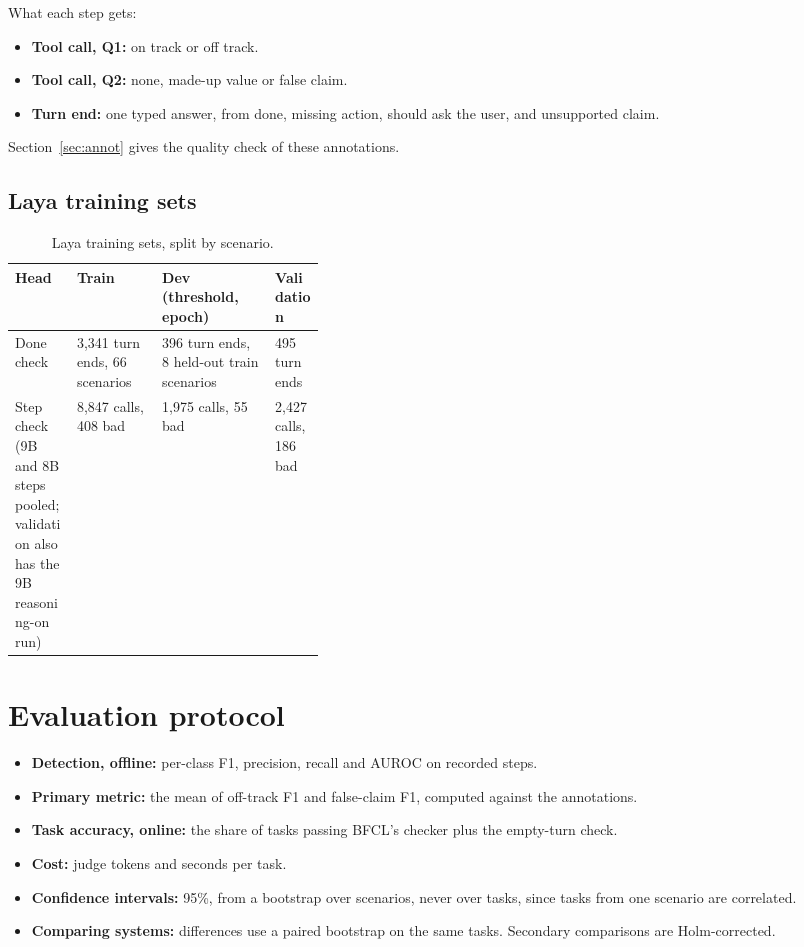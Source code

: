 \documentclass[10.5pt,a4paper]{article}
\newcommand{\tablestyle}{\small\rowcolors{2}{rowshade}{white}}
\begin{document}
What each step gets:
\begin{itemize}
  \item \textbf{Tool call, Q1:} on track or off track.
  \item \textbf{Tool call, Q2:} none, made-up value or false claim.
  \item \textbf{Turn end:} one typed answer, from done, missing action, should ask the user, and unsupported claim.
\end{itemize}

Section~\ref{sec:annot} gives the quality check of these annotations.

\subsection{Laya training sets}
\begin{table}[H]
\centering\tablestyle
\caption{Laya training sets, split by scenario.}\label{tab:layadata}
\begin{tabularx}{\linewidth}{P{0.2\linewidth}YYP{0.16\linewidth}}
\toprule
{}\textbf{Head} & \textbf{Train} & \textbf{Dev (threshold, epoch)} & \textbf{Validation} \\
\midrule
Done check & 3,341 turn ends, 66 scenarios & 396 turn ends, 8 held-out train scenarios & 495 turn ends \\
Step check (9B and 8B steps pooled; validation also has the 9B reasoning-on run) & 8,847 calls, 408 bad & 1,975 calls, 55 bad & 2,427 calls, 186 bad \\
\bottomrule
\end{tabularx}
\end{table}

\section{Evaluation protocol}
\begin{itemize}
  \item \textbf{Detection, offline:} per-class F1, precision, recall and AUROC on recorded steps.
  \item \textbf{Primary metric:} the mean of off-track F1 and false-claim F1, computed against the annotations.
  \item \textbf{Task accuracy, online:} the share of tasks passing BFCL's checker plus the empty-turn check.
  \item \textbf{Cost:} judge tokens and seconds per task.
  \item \textbf{Confidence intervals:} 95\%, from a bootstrap over scenarios, never over tasks, since tasks from one scenario are correlated.
  \item \textbf{Comparing systems:} differences use a paired bootstrap on the same tasks. Secondary comparisons are Holm-corrected.
\end{itemize}
\end{document}

